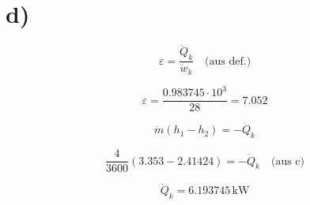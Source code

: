 

\section*{d)}

\begin{equation*}
\varepsilon = \frac{\dot{Q}_k}{\dot{w}_k} \quad \text{(aus def.)}
\end{equation*}

\begin{equation*}
\varepsilon = \frac{0.983745 \cdot 10^3}{28} = 7.052
\end{equation*}

\begin{equation*}
\dot{m} (h_1 - h_2) = -\dot{Q}_k
\end{equation*}

\begin{equation*}
\frac{4}{3600} \left(3.353 - 2.41424\right) = -\dot{Q}_k \quad \text{(aus c)}
\end{equation*}

\begin{equation*}
\dot{Q}_k = 6.193745 \, \text{kW}
\end{equation*}
